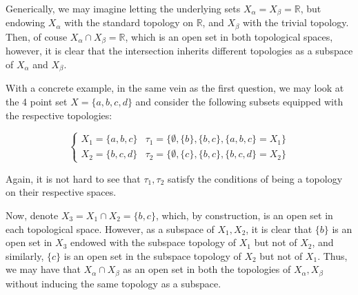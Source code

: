 \documentclass[10pt]{article}
\begin{document}
Generically, we may imagine letting the underlying sets $X_\alpha = X_\beta = \mathbb{R}$, but endowing $X_\alpha$ with the standard topology on $\mathbb{R}$, and $X_\beta$ with the trivial topology. Then, of couse $X_\alpha \cap X_\beta = \mathbb{R}$, which is an open set in both topological spaces, however, it is clear that the intersection inherits different topologies as a subspace of $X_\alpha$ and $X_\beta$.

With a concrete example, in the same vein as the first question, we may look at the 4 point set $X = \{ a,b,c,d \}$ and consider the following subsets equipped with the respective topologies:

$$\begin{cases} X_1 = \{ a, b, c \} & \tau_1 = \{ \emptyset, \{ b \}, \{ b,c \}, \{a, b, c\} = X_1 \} \\  X_2 = \{ b,c, d \} & \tau_2 = \{ \emptyset, \{ c \}, \{ b,c \}, \{ b,c,d \} = X_2 \} \end{cases} $$

Again, it is not hard to see that $\tau_1, \tau_2$ satisfy the conditions of being a topology on their respective spaces.

Now, denote $X_3 = X_1 \cap X_2 = \{ b,c\}$, which, by construction, is an open set in each topological space. However, as a subspace of $X_1, X_2$, it is clear that $\{ b \}$ is an open set in $X_3$ endowed with the subspace topology of $X_1$ but not of $X_2$, and similarly, $\{ c \}$ is an open set in the  subspace topology of $X_2$ but not of $X_1$. Thus, we may have that $X_\alpha \cap X_\beta$ as an open set in both the topologies of $X_\alpha, X_\beta$ without inducing the same topology as a subspace.
\end{document}
